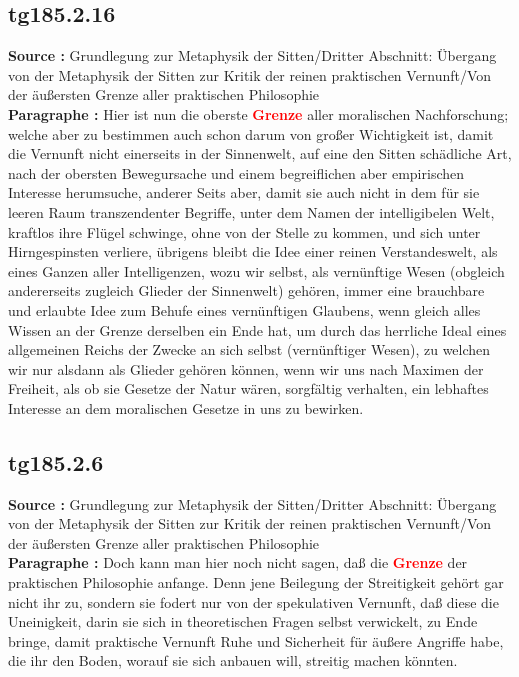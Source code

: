 \documentclass[a4paper,12pt,twoside]{book}
\newcommand{\match}[1]{\textcolor{red}{\textbf{#1}}}
\begin{document}
	
	\subsection*{tg185.2.16} 
	\textbf{Source : }Grundlegung zur Metaphysik der Sitten/Dritter Abschnitt: Übergang von der Metaphysik der Sitten zur Kritik der reinen praktischen Vernunft/Von der äußersten Grenze aller praktischen Philosophie\\  
	
	\noindent\textbf{Paragraphe : }Hier ist nun die oberste \match{Grenze} aller moralischen Nachforschung; welche aber zu bestimmen auch schon darum von großer Wichtigkeit ist, damit die Vernunft nicht einerseits in der Sinnenwelt, auf eine den Sitten schädliche Art, nach der obersten Bewegursache und einem begreiflichen aber empirischen Interesse herumsuche, anderer Seits aber, damit sie auch nicht in dem für sie leeren Raum transzendenter Begriffe, unter dem Namen der intelligibelen Welt, kraftlos ihre Flügel schwinge, ohne von der Stelle zu kommen, und sich unter Hirngespinsten verliere, übrigens bleibt die Idee einer reinen Verstandeswelt, als eines Ganzen aller Intelligenzen, wozu wir selbst, als vernünftige Wesen (obgleich andererseits zugleich Glieder der Sinnenwelt) gehören, immer eine brauchbare und erlaubte Idee zum Behufe eines vernünftigen Glaubens, wenn gleich alles Wissen an der Grenze derselben ein Ende hat, um durch das  herrliche Ideal eines allgemeinen Reichs der Zwecke an sich selbst (vernünftiger Wesen), zu welchen wir nur alsdann als Glieder gehören können, wenn wir uns nach Maximen der Freiheit, als ob sie Gesetze der Natur wären, sorgfältig verhalten, ein lebhaftes Interesse an dem moralischen Gesetze in uns zu bewirken. 
	
	\subsection*{tg185.2.6} 
	\textbf{Source : }Grundlegung zur Metaphysik der Sitten/Dritter Abschnitt: Übergang von der Metaphysik der Sitten zur Kritik der reinen praktischen Vernunft/Von der äußersten Grenze aller praktischen Philosophie\\  
	
	\noindent\textbf{Paragraphe : }Doch kann man hier noch nicht sagen, daß die \match{Grenze} der praktischen Philosophie anfange. Denn jene Beilegung der Streitigkeit gehört gar nicht ihr zu, sondern sie fodert nur von der spekulativen Vernunft, daß diese die Uneinigkeit, darin sie sich in theoretischen Fragen selbst verwickelt, zu Ende bringe, damit praktische Vernunft Ruhe und Sicherheit für äußere Angriffe habe, die ihr den Boden, worauf sie sich anbauen will, streitig machen könnten. 
	
\end{document}

